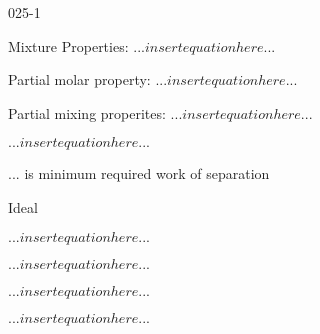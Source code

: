 \begin{mitframe}{025-1}

    
\begin{listone}
        
    \item Mixture Properties: $...insert equation here...$
        
    \item Partial molar property: $...insert equation here...$
         
    \item Partial mixing properites: $...insert equation here...$

    \item $...insert equation here...$
    
    \item $...$ is minimum required work of separation
        
    \item Ideal

	\item $...insert equation here...$
    
    \item $...insert equation here...$
    
    \item $...insert equation here...$
    
    \item $...insert equation here...$
                   
\end{listone}			

\end{mitframe}